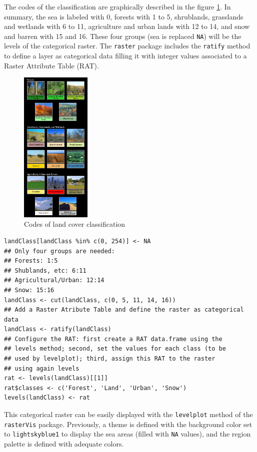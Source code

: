 The codes of the classification are graphically described in the
figure \ref{fig:lccKey}. In summary, the sea is labeled with 0,
forests with 1 to 5, shrublands, grasslands and wetlands with 6 to
11, agriculture and urban lands with 12 to 14, and snow and barren
with 15 and 16.  These four groups (sea is replaced \texttt{NA}) will be
the levels of the categorical raster. The \texttt{raster} package
includes the \texttt{ratify} method to define a layer as categorical data
filling it with integer values associated to a Raster Attribute
Table (RAT).

\begin{figure}
\includegraphics[width=0.3\textwidth]{figs/lcc_key.jpg}
\caption{\label{fig:lccKey}Codes of land cover classification}
\end{figure}


\lstset{language=R}
\begin{lstlisting}
landClass[landClass %in% c(0, 254)] <- NA
## Only four groups are needed:
## Forests: 1:5
## Shublands, etc: 6:11
## Agricultural/Urban: 12:14
## Snow: 15:16
landClass <- cut(landClass, c(0, 5, 11, 14, 16))
## Add a Raster Atribute Table and define the raster as categorical data
landClass <- ratify(landClass)
## Configure the RAT: first create a RAT data.frame using the
## levels method; second, set the values for each class (to be
## used by levelplot); third, assign this RAT to the raster
## using again levels
rat <- levels(landClass)[[1]]
rat$classes <- c('Forest', 'Land', 'Urban', 'Snow')
levels(landClass) <- rat
\end{lstlisting}

This categorical raster can be easily displayed with the
\texttt{levelplot} method of the \texttt{rasterVis} package. Previously, a theme
is defined with the background color set to \texttt{lightskyblue1} to
display the sea areas (filled with \texttt{NA} values), and the region
palette is defined with adequate colors.

